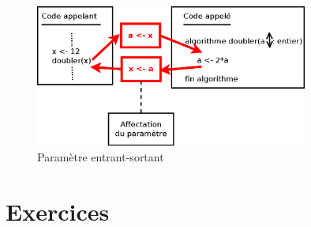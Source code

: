 	\begin{figure}[!h]
		\begin{center}
		\includegraphics[width=0.8\textwidth]{image/figure-parametres-entrant-sortants}
	    \caption{Paramètre entrant-sortant}
	    \label{fig:parinout}
		\end{center}
	\end{figure}

\section{Exercices}

